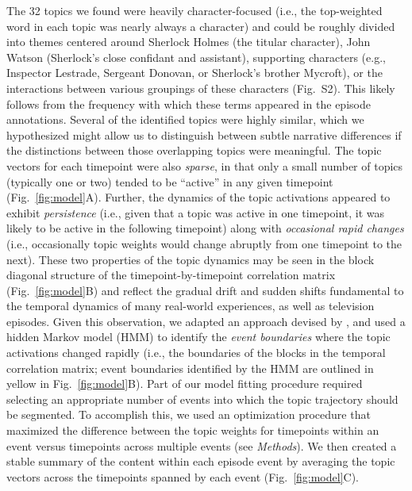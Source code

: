\documentclass[10pt]{article}
\newcommand{\topics}{S2}
\begin{document}
The 32 topics we found were heavily character-focused (i.e., the top-weighted word in each topic was nearly always a character) and could be roughly divided into themes centered around Sherlock Holmes (the titular character), John Watson (Sherlock's close confidant and assistant), supporting characters (e.g., Inspector Lestrade, Sergeant Donovan, or Sherlock's brother Mycroft), or the interactions between various groupings of these characters (Fig.~\topics).  This likely follows from the frequency with which these terms appeared in the episode annotations.  Several of the identified topics were highly similar, which we hypothesized might allow us to distinguish between subtle narrative differences if the distinctions between those overlapping topics were meaningful.  The topic vectors for each timepoint were also \textit{sparse}, in that only a small number of topics (typically one or two) tended to be ``active'' in any given timepoint (Fig.~\ref{fig:model}A).  Further, the dynamics of the topic activations appeared to exhibit \textit{persistence} (i.e., given that a topic was active in one timepoint, it was likely to be active in the following timepoint) along with \textit{occasional rapid changes} (i.e., occasionally topic weights would change abruptly from one timepoint to the next).  These two properties of the topic dynamics may be seen in the block diagonal structure of the timepoint-by-timepoint correlation matrix (Fig.~\ref{fig:model}B) and reflect the gradual drift and sudden shifts fundamental to the temporal dynamics of many real-world experiences, as well as television episodes.  Given this observation, we adapted an approach devised by \cite{BaldEtal17}, and used a hidden Markov model (HMM) to identify the \textit{event boundaries} where the topic activations changed rapidly (i.e., the boundaries of the blocks in the temporal correlation matrix; event boundaries identified by the HMM are outlined in yellow in Fig.~\ref{fig:model}B).  Part of our model fitting procedure required selecting an appropriate number of events into which the topic trajectory should be segmented.  To accomplish this, we used an optimization procedure that maximized the difference between the topic weights for timepoints within an event versus timepoints across multiple events (see \textit{Methods}).  We then created a stable summary of the content within each episode event by averaging the topic vectors across the timepoints spanned by each event (Fig.~\ref{fig:model}C).
\end{document}
